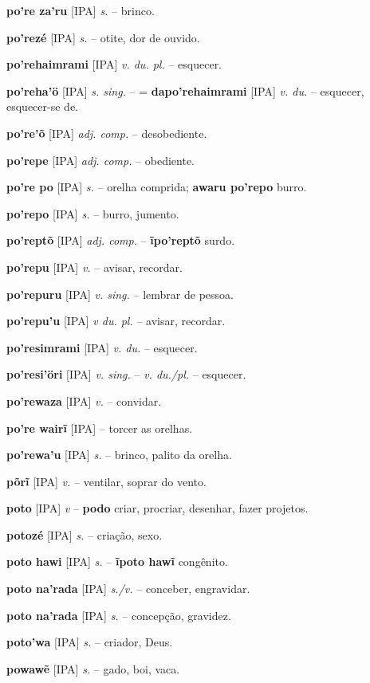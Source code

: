 \textbf{po're za'ru} [IPA] \textit{s.} -- brinco.

\textbf{po'rezé} [IPA] \textit{s.} -- otite, dor de ouvido.

\textbf{po'rehaimrami} [IPA] \textit{v. du. pl.} -- esquecer.

\textbf{po'reha'ö} [IPA] \textit{s. sing.} -- = \textbf{dapo'rehaimrami} [IPA] \textit{v. du.} -- esquecer, esquecer-se de.

\textbf{po're'õ} [IPA] \textit{adj. comp.} -- desobediente.

\textbf{po'repe} [IPA] \textit{adj. comp.} -- obediente.

\textbf{po're po} [IPA] \textit{s.} -- orelha comprida; \textbf{awaru po'repo} burro.

\textbf{po'repo} [IPA] \textit{s.} -- burro, jumento.

\textbf{po'reptõ} [IPA] \textit{adj. comp.} -- \textbf{ĩpo'reptõ} surdo.

\textbf{po'repu} [IPA] \textit{v.} -- avisar, recordar.

\textbf{po'repuru} [IPA] \textit{v. sing.} -- lembrar de pessoa.

\textbf{po'repu'u} [IPA] \textit{v du. pl.} -- avisar, recordar.

\textbf{po'resimrami} [IPA] \textit{v. du.} -- esquecer.

\textbf{po'resi'öri} [IPA] \textit{v. sing.} -- \textit{v. du./pl.} -- esquecer.

\textbf{po'rewaza} [IPA] \textit{v.} -- convidar.

\textbf{po're wairĩ} [IPA] \textit{} -- torcer as orelhas.

\textbf{po'rewa'u} [IPA] \textit{s.} -- brinco, palito da orelha.

\textbf{põrĩ} [IPA] \textit{v.} -- ventilar, soprar do vento.

\textbf{poto} [IPA] \textit{v} -- \textbf{podo} criar, procriar, desenhar, fazer projetos.

\textbf{potozé} [IPA] \textit{s.} -- criação, sexo.

\textbf{poto hawi} [IPA] \textit{s.} -- \textbf{ĩpoto hawĩ} congênito.

\textbf{poto na'rada} [IPA] \textit{s./v.} -- conceber, engravidar.

\textbf{poto na'rada} [IPA] \textit{s.} -- concepção, gravidez.

\textbf{poto'wa} [IPA] \textit{s.} -- criador, Deus.

\textbf{powawẽ} [IPA] \textit{s.} -- gado, boi, vaca.

